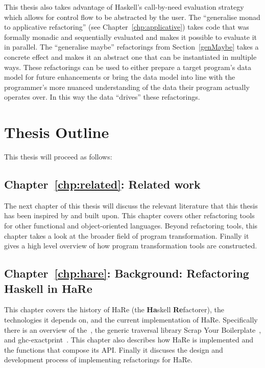 This thesis also takes advantage of Haskell's call-by-need evaluation strategy which allows for control flow to be abstracted by the user. The ``generalise monad to applicative refactoring'' (see Chapter~\ref{chp:applicative}) takes code that was formally monadic and sequentially evaluated and makes it possible to evaluate it in parallel. The ``generalise maybe'' refactorings from Section~\ref{genMaybe} takes a concrete effect and makes it an abstract one that can be instantiated in multiple ways. These refactorings can be used to either prepare a target program's data model for future enhancements or bring the data model into line with the programmer's more nuanced understanding of the data their program actually operates over. In this way the data ``drives'' these refactorings.

\section{Thesis Outline}

This thesis will proceed as follows:


\subsection*{Chapter~\ref{chp:related}: Related work}

The next chapter of this thesis will discuss the relevant literature that this thesis has been inspired by and built upon. This chapter covers other refactoring tools for other functional and object-oriented languages. Beyond refactoring tools, this chapter takes a look at the broader field of program transformation. Finally it gives a high level overview of how program transformation tools are constructed.

\subsection*{Chapter~\ref{chp:hare}: Background: Refactoring Haskell in HaRe}

This chapter covers the history of HaRe (the \textbf{Ha}skell \textbf{Re}factorer), the technologies it depends on, and the current implementation of HaRe. Specifically there is an overview of the~\citep{ghcApi}, the generic traversal library Scrap Your Boilerplate~\citep{syb}, and ghc-exactprint~\citep{exactprint}. This chapter also describes how HaRe is implemented and the functions that compose its API. Finally it discuses the design and development process of implementing refactorings for HaRe.

